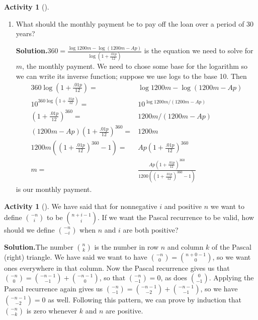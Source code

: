 \documentclass[10pt,]{book}
\theoremstyle{plain}
\theoremstyle{definition}
\newtheorem{activity}[project]{Activity}
\numberwithin{equation}{chapter}
\newcommand{\amp}{&}
\begin{document}
\begin{activity}[]
\begin{enumerate}[label=(\alph*)]
~\par
\item What should the monthly payment be to pay off the loan over a period of 30 years?%
\par\medskip\noindent%
\textbf{Solution.}\quad \(360=\frac{\log
1200m-\log (1200m-Ap)}{\log (1+\frac{.01p}{12})}\) is the equation we need to solve for \(m\), the monthly payment. We need to chose some base for the logarithm so we can write its inverse function; suppose we use logs to the base 10. Then%
\begin{align*}
360\log (1+\frac{.01p}{12})  =\amp  \log
1200m-\log (1200m-Ap)\\
10^{360\log (1+\frac{.01p}{12})} =\amp 10^{\log
1200m/(1200m-Ap)}\\
(1+\frac{.01p}{12})^{360}  =\amp 1200m/(1200m-Ap)\\
\left(1200m-Ap\right)(1+\frac{.01p}{12})^{360} =\amp 1200m\\
1200m\left((1+\frac{.01p}{12})^{360}-1\right) =\amp  Ap(1+\frac{.01p}{12})^{360}\\
m  =\amp  \frac{Ap(1+\frac{.01p}{12})^{360}}{1200\left((1+\frac{.01p}{12})^{360}-1\right)}
\end{align*}
is our monthly payment.%

\end{enumerate}
\end{activity}
\begin{activity}[]\label{activity-214}
We have said that for nonnegative \(i\) and positive \(n\) we want to define \(\binom{-n}{i}\) to be \(\binom{n+i-1}{i}\). If we want the Pascal recurrence to be valid, how should we define \(\binom{-n}{-i}\) when \(n\) and \(i\) are both positive?%
\par\medskip\noindent%
\textbf{Solution.}\quad The number \(\binom{n}{k}\) is the number in row \(n\) and column \(k\) of the Pascal (right) triangle. We have said we want to have \(\binom{-n}{0}=\binom{n+0-1}{0}\), so we want ones everywhere in that column. Now the Pascal recurrence gives us that \(\binom{-n}{0}=\binom{-n-1}{-1} +\binom{-n-1}{0}\), so that \(\binom{-n}{-1}=0\), as does \(\binom{0}{-1}\). Applying the Pascal recurrence again gives us \(\binom{-n}{-1}= \binom{-n-1}{-2} +\binom{-n-1}{-1}\), so we have \(\binom{-n-1}{-2}=0\) as well. Following this pattern, we can prove by induction that \(\binom{-n}{-k}\) is zero whenever \(k\) and \(n\) are positive.%
\end{activity}
\end{document}
